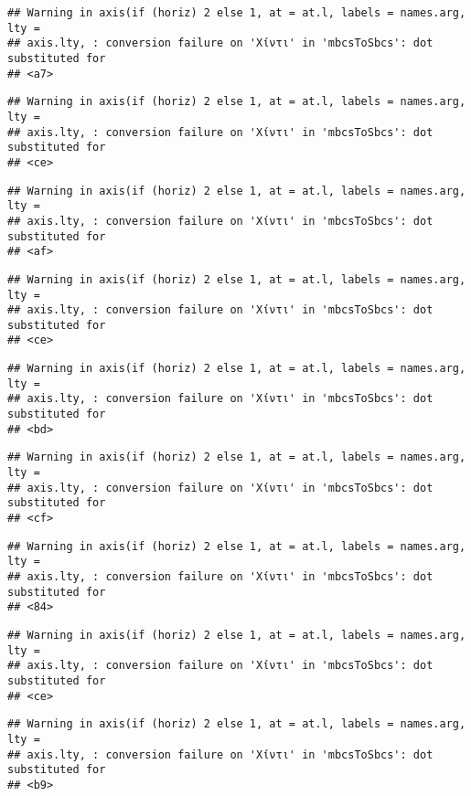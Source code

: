 \documentclass[
]{article}
\begin{document}
\begin{verbatim}
## Warning in axis(if (horiz) 2 else 1, at = at.l, labels = names.arg, lty =
## axis.lty, : conversion failure on 'Χίντι' in 'mbcsToSbcs': dot substituted for
## <a7>
\end{verbatim}

\begin{verbatim}
## Warning in axis(if (horiz) 2 else 1, at = at.l, labels = names.arg, lty =
## axis.lty, : conversion failure on 'Χίντι' in 'mbcsToSbcs': dot substituted for
## <ce>
\end{verbatim}

\begin{verbatim}
## Warning in axis(if (horiz) 2 else 1, at = at.l, labels = names.arg, lty =
## axis.lty, : conversion failure on 'Χίντι' in 'mbcsToSbcs': dot substituted for
## <af>
\end{verbatim}

\begin{verbatim}
## Warning in axis(if (horiz) 2 else 1, at = at.l, labels = names.arg, lty =
## axis.lty, : conversion failure on 'Χίντι' in 'mbcsToSbcs': dot substituted for
## <ce>
\end{verbatim}

\begin{verbatim}
## Warning in axis(if (horiz) 2 else 1, at = at.l, labels = names.arg, lty =
## axis.lty, : conversion failure on 'Χίντι' in 'mbcsToSbcs': dot substituted for
## <bd>
\end{verbatim}

\begin{verbatim}
## Warning in axis(if (horiz) 2 else 1, at = at.l, labels = names.arg, lty =
## axis.lty, : conversion failure on 'Χίντι' in 'mbcsToSbcs': dot substituted for
## <cf>
\end{verbatim}

\begin{verbatim}
## Warning in axis(if (horiz) 2 else 1, at = at.l, labels = names.arg, lty =
## axis.lty, : conversion failure on 'Χίντι' in 'mbcsToSbcs': dot substituted for
## <84>
\end{verbatim}

\begin{verbatim}
## Warning in axis(if (horiz) 2 else 1, at = at.l, labels = names.arg, lty =
## axis.lty, : conversion failure on 'Χίντι' in 'mbcsToSbcs': dot substituted for
## <ce>
\end{verbatim}

\begin{verbatim}
## Warning in axis(if (horiz) 2 else 1, at = at.l, labels = names.arg, lty =
## axis.lty, : conversion failure on 'Χίντι' in 'mbcsToSbcs': dot substituted for
## <b9>
\end{verbatim}
\end{document}
